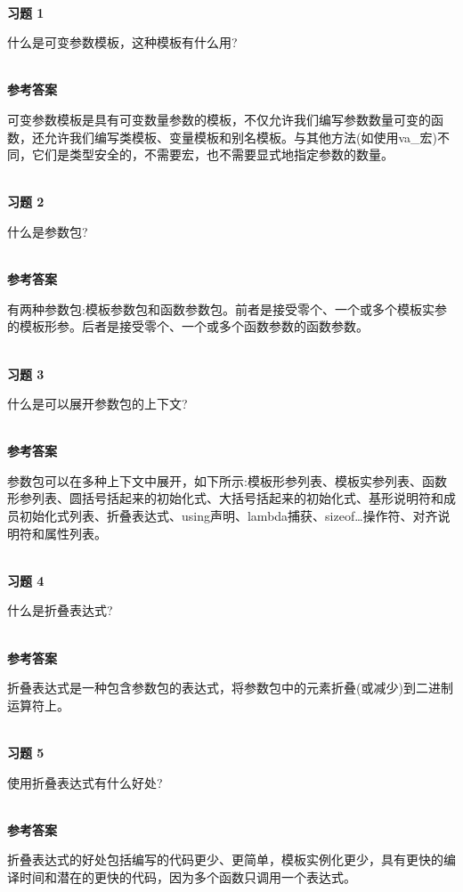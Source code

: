 \hspace*{\fill} \\ %
\noindent
\textbf{习题 1}

什么是可变参数模板，这种模板有什么用?

\hspace*{\fill} \\ %
\noindent
\textbf{参考答案}

可变参数模板是具有可变数量参数的模板，不仅允许我们编写参数数量可变的函数，还允许我们编写类模板、变量模板和别名模板。与其他方法(如使用va\_宏)不同，它们是类型安全的，不需要宏，也不需要显式地指定参数的数量。


\hspace*{\fill} \\ %
\noindent
\textbf{习题 2}

什么是参数包?

\hspace*{\fill} \\ %
\noindent
\textbf{参考答案}

有两种参数包:模板参数包和函数参数包。前者是接受零个、一个或多个模板实参的模板形参。后者是接受零个、一个或多个函数参数的函数参数。

\hspace*{\fill} \\ %
\noindent
\textbf{习题 3}

什么是可以展开参数包的上下文?

\hspace*{\fill} \\ %
\noindent
\textbf{参考答案}

参数包可以在多种上下文中展开，如下所示:模板形参列表、模板实参列表、函数形参列表、圆括号括起来的初始化式、大括号括起来的初始化式、基形说明符和成员初始化式列表、折叠表达式、using声明、lambda捕获、sizeof…操作符、对齐说明符和属性列表。

\hspace*{\fill} \\ %
\noindent
\textbf{习题 4}

什么是折叠表达式?

\hspace*{\fill} \\ %
\noindent
\textbf{参考答案}

折叠表达式是一种包含参数包的表达式，将参数包中的元素折叠(或减少)到二进制运算符上。

\hspace*{\fill} \\ %
\noindent
\textbf{习题 5}

使用折叠表达式有什么好处?

\hspace*{\fill} \\ %
\noindent
\textbf{参考答案}

折叠表达式的好处包括编写的代码更少、更简单，模板实例化更少，具有更快的编译时间和潜在的更快的代码，因为多个函数只调用一个表达式。












